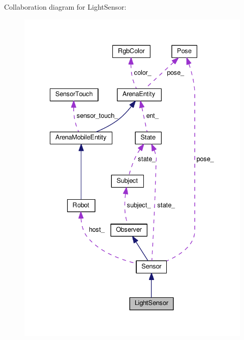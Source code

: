 Collaboration diagram for Light\+Sensor\+:\nopagebreak
\begin{figure}[H]
\begin{center}
\leavevmode
\includegraphics[width=334pt]{classLightSensor__coll__graph}
\end{center}
\end{figure}
